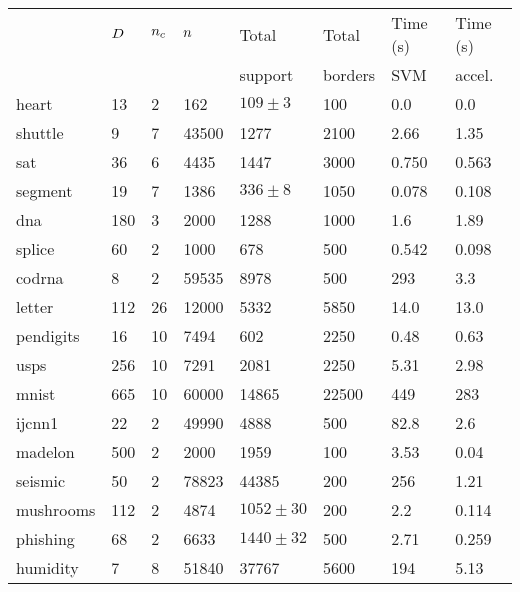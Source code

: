 \begin{tabular}{|l|lllllll|}
	\hline
	& $D$ & $n_c$ & $n$ & Total & Total & Time (s) & Time (s)\\
	& & & & support & borders & SVM & accel. \\\hline
	heart & 13 & 2 & 162 & $109\pm3$ & 100 & 0.0 & 0.0\\
	shuttle & 9 & 7 & 43500 & 1277 & 2100 & 2.66 & 1.35\\
	sat & 36 & 6 & 4435 & 1447 & 3000 & 0.750 & 0.563 \\
	segment & 19 & 7 & 1386 & $336\pm8$ & 1050 & 0.078 & 0.108 \\
	dna & 180 & 3 & 2000 & 1288 & 1000 & 1.6 & 1.89 \\
	splice & 60 & 2 & 1000 & 678 & 500 & 0.542 & 0.098 \\
	codrna & 8 & 2 & 59535 & 8978 & 500 & 293 & 3.3 \\
	letter & 112 & 26 & 12000 & 5332 & 5850 & 14.0 & 13.0 \\ 
	pendigits & 16 & 10 & 7494 & 602 & 2250 & 0.48 & 0.63 \\
	usps & 256 & 10 & 7291 & 2081 & 2250 & 5.31 & 2.98 \\
	mnist & 665 & 10 & 60000 & 14865 & 22500 & 449 & 283 \\
	ijcnn1 & 22 & 2 & 49990 & 4888 & 500 & 82.8 & 2.6 \\
	madelon & 500 & 2 & 2000 & 1959 & 100 & 3.53 & 0.04 \\
	seismic & 50 & 2 & 78823 & 44385 & 200 & 256 & 1.21 \\
	mushrooms & 112 & 2 & 4874 & $1052\pm30$ & 200 & 2.2 & 0.114 \\
	phishing & 68 & 2 & 6633 & $1440\pm32$ & 500 & 2.71 & 0.259 \\
	humidity & 7 & 8 & 51840 & 37767 & 5600 & 194 & 5.13 \\ 
	\hline
\end{tabular}

